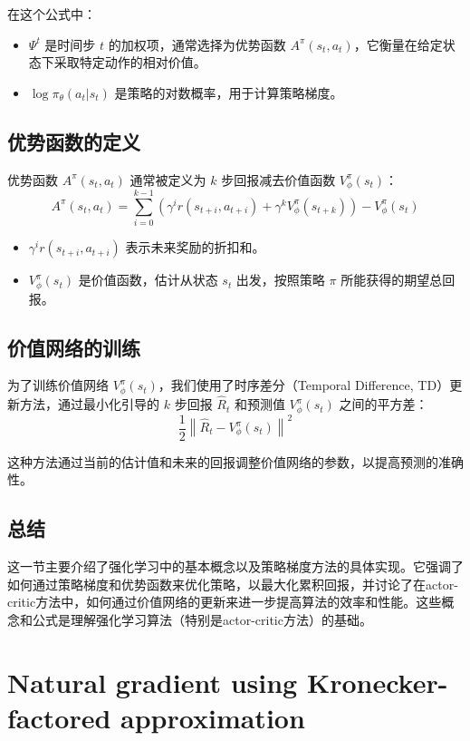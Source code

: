 \documentclass[twocolumn, 10pt]{article} %
\theoremstyle{remark}
\begin{document}
在这个公式中：
\begin{itemize}
    \item $\Psi^t$ 是时间步 $t$ 的加权项，通常选择为优势函数 $A^\pi(s_t, a_t)$，它衡量在给定状态下采取特定动作的相对价值。
    \item $\log \pi_\theta(a_t | s_t)$ 是策略的对数概率，用于计算策略梯度。
\end{itemize}

\subsection{优势函数的定义}
优势函数 $A^\pi(s_t, a_t)$ 通常被定义为 $k$ 步回报减去价值函数 $V^\pi_\phi(s_t)$：
\[
    A^\pi(s_t, a_t) = \sum_{i=0}^{k-1} \left( \gamma^i r(s_{t+i}, a_{t+i}) + \gamma^k V^\pi_\phi(s_{t+k}) \right) - V^\pi_\phi(s_t)
\]

\begin{itemize}
    \item $\gamma^i r(s_{t+i}, a_{t+i})$ 表示未来奖励的折扣和。
    \item $V^\pi_\phi(s_t)$ 是价值函数，估计从状态 $s_t$ 出发，按照策略 $\pi$ 所能获得的期望总回报。
\end{itemize}

\subsection{价值网络的训练}
为了训练价值网络 $V^\pi_\phi(s_t)$，我们使用了时序差分（Temporal Difference, TD）更新方法，通过最小化引导的 $k$ 步回报 $\hat{R}_t$ 和预测值 $V^\pi_\phi(s_t)$ 之间的平方差：
\[
    \frac{1}{2} \left\| \hat{R}_t - V^\pi_\phi(s_t) \right\|^2
\]

这种方法通过当前的估计值和未来的回报调整价值网络的参数，以提高预测的准确性。

\subsection{总结}
这一节主要介绍了强化学习中的基本概念以及策略梯度方法的具体实现。它强调了如何通过策略梯度和优势函数来优化策略，以最大化累积回报，并讨论了在actor-critic方法中，如何通过价值网络的更新来进一步提高算法的效率和性能。这些概念和公式是理解强化学习算法（特别是actor-critic方法）的基础。

\section{Natural gradient using Kronecker-factored approximation}
\end{document}
